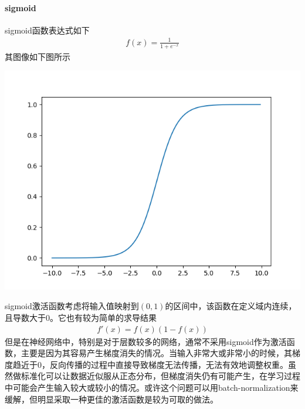 \paragraph{sigmoid}
sigmoid函数表达式如下
\begin{eqnarray}
f(x)=\frac{1}{1+e^{-x}}
\end{eqnarray}
其图像如下图所示
\begin{center}
\includegraphics[scale=0.5]{../figures/NN3.png} 
\end{center}
sigmoid激活函数考虑将输入值映射到$(0,1)$的区间中，该函数在定义域内连续，且导数大于0。它也有较为简单的求导结果
\begin{eqnarray}
f'(x)=f(x)(1-f(x))
\end{eqnarray}
但是在神经网络中，特别是对于层数较多的网络，通常不采用sigmoid作为激活函数，主要是因为其容易产生梯度消失的情况。当输入非常大或非常小的时候，其梯度趋近于0，反向传播的过程中直接导致梯度无法传播，无法有效地调整权重。虽然做标准化可以让数据近似服从正态分布，但梯度消失仍有可能产生，在学习过程中可能会产生输入较大或较小的情况。或许这个问题可以用batch-normalization来缓解，但明显采取一种更佳的激活函数是较为可取的做法。
